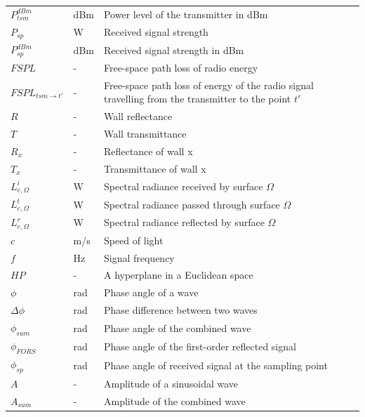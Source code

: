 \documentclass[12pt]{article}
\begin{document}
\begin{longtable*}{l l p{12cm}}
\\
$P_{tsm}^{dBm}$ & \si[per-mode=symbol] {dBm} & Power level of the transmitter in dBm
\\
$P_{sp}$ & \si[per-mode=symbol] {\watt} & Received signal strength
\\
$P_{sp}^{dBm}$ & \si[per-mode=symbol] {dBm} & Received signal strength in dBm
\\
$FSPL$ & \si[per-mode=symbol] {-} & Free-space path loss of radio energy
\\
$FSPL_{tsm\rightarrow t'}$ & \si[per-mode=symbol] {-} & Free-space path loss of 
energy of the radio signal travelling from the transmitter to the point $t'$
\\
$R$ & \si[per-mode=symbol] {-} & Wall reflectance
\\
$T$ & \si[per-mode=symbol] {-} & Wall transmittance
\\
$R_x$ & \si[per-mode=symbol] {-} & Reflectance of wall x
\\
$T_x$ & \si[per-mode=symbol] {-} & Transmittance of wall x
\\
$L_{e,\Omega}^i$& \si[per-mode=symbol] {\watt} & Spectral radiance received by 
surface $\Omega$
\\
$L_{e,\Omega}^t$& \si[per-mode=symbol] {\watt} & Spectral radiance passed through 
surface $\Omega$
\\
$L_{e,\Omega}^r$& \si[per-mode=symbol] {\watt} & Spectral radiance reflected by 
surface $\Omega$
\\
$c$ & \si[per-mode=symbol] {\metre/\second} & Speed of light
\\
$f$ & \si[per-mode=symbol] {\hertz} & Signal frequency
\\
$HP$ & \si[per-mode=symbol] {-} & A hyperplane in a Euclidean space
\\
$\phi$ & \si[per-mode=symbol] {\radian} & Phase angle of a wave
\\
$\Delta \phi$ & \si[per-mode=symbol] {\radian} & Phase difference between two waves
\\
$\phi_{sum}$ & \si[per-mode=symbol] {\radian} & Phase angle of the combined wave
\\
$\phi_{FORS}$ & \si[per-mode=symbol] {\radian} & Phase angle of the first-order
reflected signal
\\
$\phi_{sp}$ & \si[per-mode=symbol] {\radian} & Phase angle of received signal
at the sampling point
\\
$A$ & \si[per-mode=symbol] {-} & Amplitude of a sinusoidal wave
\\
$A_{sum}$ & \si[per-mode=symbol] {-} & Amplitude of the combined wave

\end{longtable*}
\end{document}
